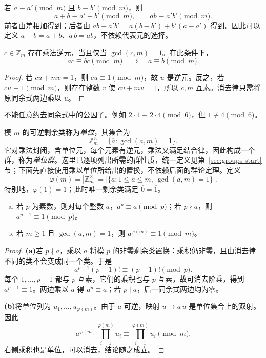 \documentclass[lang=cn,a4paper,fontset=none,zihao=false,10pt,openany,twoside]{beautybook}
\numberwithin{algorithm}{chapter}
\begin{document}
若 $a\equiv a'\pmod m$ 且 $b\equiv b'\pmod m$，则
\[
 a+b\equiv a'+b'\pmod m,\qquad ab\equiv a'b'\pmod m.
\]
前者由差相加得到；后者由 $ab-a'b'=a(b-b')+b'(a-a')$ 得到。因此可以定义
$\overline a+\overline b=\overline{a+b}$、$\overline a\,\overline b=\overline{ab}$，不依赖代表元的选择。

\begin{proposition}[模逆元与消去律]
$\overline c\in\mathbb Z_m$ 存在乘法逆元，当且仅当 $\gcd(c,m)=1$。在此条件下，
\[
 ac\equiv bc\pmod m\quad\Longrightarrow\quad a\equiv b\pmod m.
\]
\end{proposition}
\begin{proof}
若 $cu+mv=1$，则 $cu\equiv1\pmod m$，故 $\overline u$ 是逆元。反之，若 $cu\equiv1\pmod m$，则存在整数 $v$ 使 $cu+mv=1$，所以 $c,m$ 互素。消去律只需将原同余式两边乘以 $u$。
\end{proof}
不能任意约去同余式中的公因子。例如 $2\cdot1\equiv2\cdot4\pmod6$，但 $1\not\equiv4\pmod6$。

\begin{definition}
模 $m$ 的可逆剩余类称为\emph{单位}，其集合为
\[
 \mathbb Z_m^\times=\{\overline a:\gcd(a,m)=1\}.
\]
它对乘法封闭，含单位元，每个元素有逆元，乘法又满足结合律，因此构成一个群，称为\emph{单位群}。这里已逐项列出所需的群性质，统一定义见第~\ref{sec:groups-start} 节；下面先直接使用乘以单位所给出的置换，不依赖后面的群论定理。定义
\[
 \varphi(m)=|\mathbb Z_m^\times|
 =|\{a:1\le a\le m,\ \gcd(a,m)=1\}|.
\]
特别地，$\varphi(1)=1$；此时唯一剩余类满足 $\overline0=\overline1$。
\end{definition}

\begin{theorem}\label{thm:fermat-euler}
\begin{enumerate}[(a)]
\item 若 $p$ 为素数，则对每个整数 $a$，$a^p\equiv a\pmod p$；若 $p\nmid a$，则 $a^{p-1}\equiv1\pmod p$。
\item 若 $m\ge1$ 且 $\gcd(a,m)=1$，则 $a^{\varphi(m)}\equiv1\pmod m$。
\end{enumerate}
\end{theorem}
\begin{proof}
\par\smallskip\noindent\textbf{(a)}\quad 若 $p\nmid a$，乘以 $a$ 将模 $p$ 的非零剩余类置换：乘积仍非零，且由消去律不同的类不会变成同一个类。于是
\[
 a^{p-1}(p-1)!\equiv(p-1)!\pmod p.
\]
每个 $1,\ldots,p-1$ 都与 $p$ 互素，它们的乘积也与 $p$ 互素，故可消去阶乘，得到 $a^{p-1}\equiv1$。两边乘以 $a$ 得 $a^p\equiv a$；若 $p\mid a$，后一同余式两边均为零。

\par\smallskip\noindent\textbf{(b)}\quad 将单位列为 $\overline{u_1},\ldots,\overline{u_{\varphi(m)}}$。由于 $\overline a$ 可逆，映射 $\overline u\mapsto\overline a\,\overline u$ 是单位集合上的双射。因此
\[
 a^{\varphi(m)}\prod_{i=1}^{\varphi(m)}u_i
 \equiv\prod_{i=1}^{\varphi(m)}u_i\pmod m.
\]
右侧乘积也是单位，可以消去，结论随之成立。
\end{proof}
\end{document}
